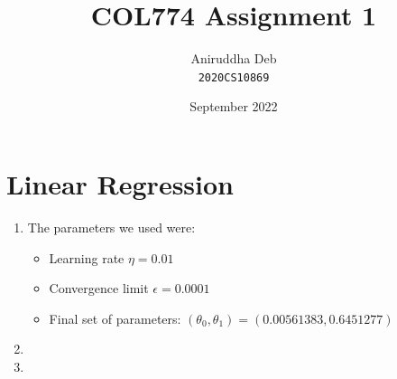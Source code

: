 \documentclass[12pt]{article}
\title{\textbf{COL774 Assignment 1}}
\author{Aniruddha Deb \\ \texttt{2020CS10869}}
\date{September 2022}
\begin{document}
\maketitle

\section*{Linear Regression}

\begin{enumerate}[label=(\alph*)]
    \item The parameters we used were:
    \begin{itemize}
        \item Learning rate $\eta = 0.01$
        \item Convergence limit $\epsilon = 0.0001$
        \item Final set of parameters: $(\theta_0,\theta_1) = (0.00561383,0.6451277)$
    \end{itemize}

    \item {}

    \item {}


\end{enumerate}
\end{document}
